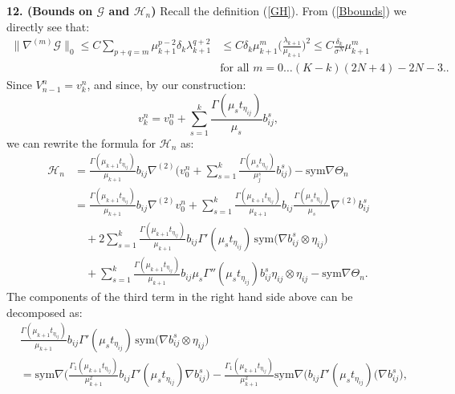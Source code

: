 \documentclass[reqno,twoside,11pt]{amsart}
\newcommand{\sym}{\mathrm{sym}}
\numberwithin{equation}{section}
\theoremstyle{plain}
\theoremstyle{definition}
\begin{document}
{\bf 12. (Bounds on $\mathcal{G}$ and $\mathcal{H}_n$)}
Recall the definition (\ref{GH}). From (\ref{Bbounds}) we directly see that:
\begin{equation}\label{Gbound}
\begin{split}
\|\nabla^{(m)}\mathcal{G}\|_0\leq C\sum_{p+q=m}
\mu_{k+1}^{p-2}\delta_k\lambda_{k+1}^{q+2} & \leq C
\delta_k\mu_{k+1}^m\big(\frac{\lambda_{k+1}}{\mu_{k+1}}\big)^2 \leq
C\frac{\delta_k}{\sigma^N}\mu_{k+1}^m 
\\ & \mbox{for all } m= 0\ldots (K-k)(2N+4)-2N-3.. 
\end{split}
\end{equation}
Since $V^n_{n-1}= v_k^n$, and since, by our construction:
$$v_k^n = v_0^n + \sum_{s=1}^k  
\frac{\Gamma(\mu_s t_{\eta_{ij}})}{\mu_s}b_{ij}^s,$$ 
we can rewrite the formula for $\mathcal{H}_n$ as:
\begin{equation}\label{H_again}
\begin{split}
\mathcal{H}_n & = \frac{\Gamma(\mu_{k+1}t_{\eta_{ij}})}{\mu_{k+1}} b_{ij}\nabla^{(2)}
\Big(v_0^n + \sum_{s=1}^k \frac{\Gamma(\mu_s t_{\eta_{ij}})}{\mu_j^s}b_{ij}^s\Big) -\sym\nabla\Theta_n
\\ & = \frac{\Gamma(\mu_{k+1}t_{\eta_{ij}})}{\mu_{k+1}} b_{ij}\nabla^{(2)}v_0^n 
+ \sum_{s=1}^k \frac{\Gamma(\mu_{k+1}t_{\eta_{ij}})}{\mu_{k+1}} b_{ij}
\frac{\Gamma(\mu_s t_{\eta_{ij}})}{\mu_s}\nabla^{(2)}b_{ij}^s 
\\ & \quad + 2 \sum_{s=1}^k \frac{\Gamma(\mu_{k+1}t_{\eta_{ij}})}{\mu_{k+1}} b_{ij}
\Gamma'(\mu_s t_{\eta_{ij}})\,\sym\big(\nabla b_{ij}^s\otimes \eta_{ij}\big)
\\ & \quad + \sum_{s=1}^k \frac{\Gamma(\mu_{k+1}t_{\eta_{ij}})}{\mu_{k+1}} b_{ij}
\mu_s \Gamma''(\mu_s t_{\eta_{ij}})b_{ij}^s\eta_{ij}\otimes \eta_{ij}
-\sym\nabla \Theta_n.
\end{split}
\end{equation}
The components of the third term in the right hand side above can be
decomposed as:
\begin{equation*}
\begin{split}
& \frac{\Gamma(\mu_{k+1}t_{\eta_{ij}})}{\mu_{k+1}} b_{ij}
\Gamma'(\mu_s t_{\eta_{ij}})\,\sym\big(\nabla b_{ij}^s\otimes
\eta_{ij}\big) \\ & = 
\sym\nabla\Big(\frac{\Gamma_1(\mu_{k+1}t_{\eta_{ij}})}{\mu_{k+1}^2} b_{ij} 
\Gamma'(\mu_s t_{\eta_{ij}})\nabla b_{ij}^s\Big)  -
\frac{\Gamma_1(\mu_{k+1}t_{\eta_{ij}})}{\mu_{k+1}^2} \sym\nabla\Big(b_{ij}
\Gamma'(\mu_s t_{\eta_{ij}})(\nabla b_{ij}^s\Big),
\end{split}
\end{equation*}
\end{document}
